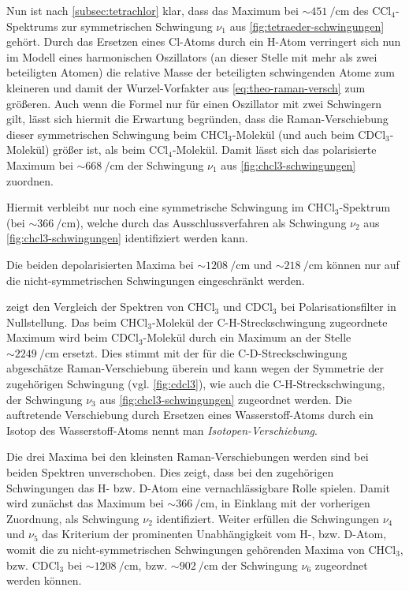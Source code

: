 \documentclass[../bericht.tex]{subfiles}
\begin{document}
        Nun ist nach \cref{subsec:tetrachlor} klar, dass das Maximum bei $\sim\SI{451}{\per\centi\meter}$ des $\mathrm{CCl_4}$-Spektrums zur symmetrischen Schwingung $\nu_1$ aus \cref{fig:tetraeder-schwingungen} gehört. Durch das Ersetzen eines Cl-Atoms durch ein H-Atom verringert sich nun im Modell eines harmonischen Oszillators (an dieser Stelle mit mehr als zwei beteiligten Atomen) die relative Masse der beteiligten schwingenden Atome zum kleineren und damit der Wurzel-Vorfakter aus \cref{eq:theo-raman-versch} zum größeren. Auch wenn die Formel nur für einen Oszillator mit zwei Schwingern gilt, lässt sich hiermit die Erwartung begründen, dass die Raman-Verschiebung dieser symmetrischen Schwingung beim $\mathrm{CHCl_3}$-Molekül (und auch beim $\mathrm{CDCl_3}$-Molekül) größer ist, als beim $\mathrm{CCl_4}$-Molekül. Damit lässt sich das polarisierte Maximum bei $\sim\SI{668}{\per\centi\meter}$ der Schwingung $\nu_1$ aus \cref{fig:chcl3-schwingungen} zuordnen.

        Hiermit verbleibt nur noch eine symmetrische Schwingung im $\mathrm{CHCl_3}$-Spektrum (bei $\sim\SI{366}{\per\centi\meter}$), welche durch das Ausschlussverfahren als Schwingung $\nu_2$ aus \cref{fig:chcl3-schwingungen} identifiziert werden kann.

        Die beiden depolarisierten Maxima bei $\sim\SI{1208}{\per\centi\meter}$ und $\sim\SI{218}{\per\centi\meter}$ können nur auf die nicht-symmetrischen Schwingungen eingeschränkt werden.
        \medskip

         zeigt den Vergleich der Spektren von $\mathrm{CHCl_3}$ und $\mathrm{CDCl_3}$ bei Polarisationsfilter in Nullstellung. Das beim $\mathrm{CHCl_3}$-Molekül der C-H-Streckschwingung zugeordnete Maximum wird beim $\mathrm{CDCl_3}$-Molekül durch ein Maximum an der Stelle $\sim\SI{2249}{\per\centi\meter}$ ersetzt. Dies stimmt mit der für die C-D-Streckschwingung abgeschätze Raman-Verschiebung überein und kann wegen der Symmetrie der zugehörigen Schwingung (vgl. \cref{fig:cdcl3}), wie auch die C-H-Streckschwingung, der Schwingung $\nu_3$ aus \cref{fig:chcl3-schwingungen} zugeordnet werden. Die auftretende Verschiebung durch Ersetzen eines Wasserstoff-Atoms durch ein Isotop des Wasserstoff-Atoms nennt man \textit{Isotopen-Verschiebung}.

        Die drei Maxima bei den kleinsten Raman-Verschiebungen werden sind bei beiden Spektren unverschoben. Dies zeigt, dass bei den zugehörigen Schwingungen das H- bzw. D-Atom eine vernachlässigbare Rolle spielen. Damit wird zunächst das Maximum bei $\sim\SI{366}{\per\centi\meter}$, in Einklang mit der vorherigen Zuordnung, als Schwingung $\nu_2$ identifiziert. Weiter erfüllen die Schwingungen $\nu_4$ und $\nu_5$ das Kriterium der prominenten Unabhängigkeit vom H-, bzw. D-Atom, womit die zu nicht-symmetrischen Schwingungen gehörenden Maxima von $\mathrm{CHCl_3}$, bzw. $\mathrm{CDCl_3}$ bei $\sim\SI{1208}{\per\centi\meter}$, bzw. $\sim\SI{902}{\per\centi\meter}$ der Schwingung $\nu_6$ zugeordnet werden können.
\end{document}
